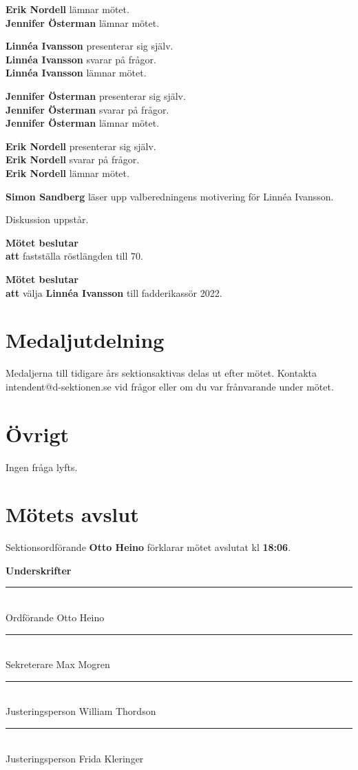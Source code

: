 \documentclass{datateknologsektionen-document}
\newcommand{\ind}{\hspace*{2em}}
\newcommand{\motetbeslutar}{\textbf{Mötet beslutar}}
\newcommand{\att}{\\\ind\textbf{att}}
\begin{document}
\textbf{Erik Nordell} lämnar mötet.\\
\textbf{Jennifer Österman} lämnar mötet.

\textbf{Linnéa Ivansson} presenterar sig själv.\\
\textbf{Linnéa Ivansson} svarar på frågor.\\
\textbf{Linnéa Ivansson} lämnar mötet.

\textbf{Jennifer Österman} presenterar sig själv.\\
\textbf{Jennifer Österman} svarar på frågor.\\
\textbf{Jennifer Österman} lämnar mötet.

\textbf{Erik Nordell} presenterar sig själv.\\
\textbf{Erik Nordell} svarar på frågor.\\
\textbf{Erik Nordell} lämnar mötet.

\textbf{Simon Sandberg} läser upp valberedningens motivering för Linnéa Ivansson.

Diskussion uppstår.

\motetbeslutar
\att{} fastställa röstlängden till 70.

\motetbeslutar
\att{} välja \textbf{Linnéa Ivansson} till fadderikassör 2022.

\section{Medaljutdelning}
Medaljerna till tidigare års sektionsaktivas delas ut efter mötet. Kontakta intendent@d-sektionen.se vid frågor eller om du var frånvarande under mötet.

\section{Övrigt}
Ingen fråga lyfts.

\section{Mötets avslut}
Sektionsordförande \textbf{Otto Heino} förklarar mötet avslutat kl \textbf{18:06}.




\pagebreak
{\Large\bfseries Underskrifter}

\vspace*{1.2cm}
\noindent\rule{8cm}{1pt}\\
Ordförande Otto Heino

\vspace*{1.2cm}
\noindent\rule{8cm}{1pt}\\
Sekreterare Max Mogren

\vspace*{1.2cm}
\noindent\rule{8cm}{1pt}\\
Justeringsperson William Thordson

\vspace*{1.2cm}
\noindent\rule{8cm}{1pt}\\
Justeringsperson Frida Kleringer
\end{document}
